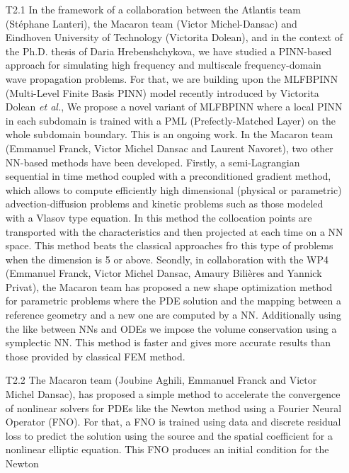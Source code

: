 \begin{itemize}
\item[T2.1] In the  framework of a collaboration  between the Atlantis
  team (St\'ephane  Lanteri), the Macaron team  (Victor Michel-Dansac)
  and Eindhoven  University of  Technology (Victorita Dolean),  and in
  the context of  the Ph.D.  thesis of Daria  Hrebenshchykova, we have
  studied  a PINN-based  approach  for simulating  high frequency  and
  multiscale frequency-domain wave propagation  problems. For that, we
  are building upon the MLFBPINN (Multi-Level Finite Basis PINN) model
  recently introduced by  Victorita Dolean {\em et al.},  We propose a
  novel variant  of MLFBPINN where a  local PINN in each  subdomain is
  trained with a PML (Prefectly-Matched  Layer) on the whole subdomain
  boundary.  This  is an ongoing  work. In the Macaron  team (Emmanuel
  Franck,  Victor  Michel  Dansac  and  Laurent  Navoret),  two  other
  NN-based methods  have been  developed.  Firstly,  a semi-Lagrangian
  sequential  in time  method coupled  with a  preconditioned gradient
  method,  which  allows  to   compute  efficiently  high  dimensional
  (physical  or parametric)  advection-diffusion problems  and kinetic
  problems such as those modeled with a Vlasov type equation.  In this
  method   the   collocation   points   are   transported   with   the
  characteristics and then projected at each time on a NN space.  This
  method beats the classical approaches fro this type of problems when
  the dimension is 5 or above.  Seondly, in collaboration with the WP4
  (Emmanuel Franck, Victor Michel  Dansac, Amaury Bilières and Yannick
  Privat),  the Macaron  team has  proposed a  new shape  optimization
  method  for  parametric problems  where  the  PDE solution  and  the
  mapping between a reference geometry and a new one are computed by a
  NN.  Additionally using the like between  NNs and ODEs we impose the
  volume conservation  using a symplectic  NN.  This method  is faster
  and gives more accurate results than those provided by classical FEM
  method.
\item[T2.2]  The Macaron  team (Joubine  Aghili, Emmanuel  Franck and
  Victor Michel  Dansac), has proposed  a simple method  to accelerate
  the convergence of nonlinear solvers for PDEs like the Newton method
  using a Fourier  Neural Operator (FNO).  For that, a  FNO is trained
  using data and discrete residual  loss to predict the solution using
  the  source and  the spatial  coefficient for  a nonlinear  elliptic
  equation.  This  FNO produces  an initial  condition for  the Newton

\end{itemize}
